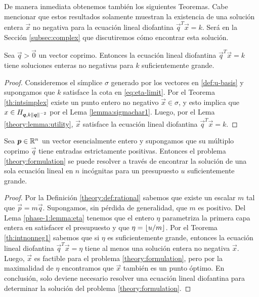 De manera inmediata obtenemos también los siguientes Teoremas. Cabe mencionar que estos resultados
solamente muestran la existencia de una solución entera $\vec{x}$ no negativa para la ecuación lineal
diofantina $\vec{q}^T\vec{x} = k$. Será en la Sección \ref{subsec:complex} que discutiremos cómo
encontrar esta solución.
\begin{theorem}
	\label{th:intnonneg1}
	Sea $\vec{q} > \vec{0}$ un vector coprimo. Entonces la ecuación lineal diofantina
	$\vec{q}^T\vec{x} = k$ tiene soluciones enteras no negativas para $k$ suficientemente grande.
\end{theorem}
\begin{proof}
	Consideremos el símplice $\sigma$ generado por los vectores en \eqref{def:u-basis} y supongamos
	que $k$ satisface la cota en \eqref{eq:eta-limit}.
	Por el Teorema \ref{th:intsimplex} existe un punto entero no negativo $\vec{x} \in \sigma$, y
	esto implica que $x \in H_{\boldsymbol{q}, k\left\lVert \boldsymbol{q} \right\rVert^{-2}}$ por el Lema \ref{lemma:sigmachar1}.
	Luego, por el Lema \ref{theory:lemma:utility}, $\vec{x}$ satisface la ecuación lineal diofantina
	$\vec{q}^T\vec{x} = k$.
\end{proof}
\begin{theorem}
	Sea $\boldsymbol{p} \in \mathbb{R}^n$ un vector esencialmente entero y supongamos que su múltiplo coprimo
	$\vec{q}$ tiene entradas estrictamente positivas. Entonces el problema
	\eqref{theory:formulation} se puede resolver a través de encontrar la solución de una sola
	ecuación lineal en $n$ incógnitas para un presupuesto $u$ suficientemente grande.
\end{theorem}
\begin{proof}
	Por la Definición \ref{theory:def:rational} sabemos que existe un escalar $m$ tal que
	$\vec{p} = m\vec{q}$. Supongamos, sin pérdida de generalidad, que $m$ es positivo. Del Lema
	\ref{phase-1:lemma:eta} tenemos que el entero $\eta$ parametriza la primera capa entera en
	satisfacer el presupuesto y que $\eta = \left\lfloor u/m \right\rfloor$. Por el Teorema \ref{th:intnonneg1} sabemos
	que si $\eta$ es suficientemente grande, entonces la ecuación lineal diofantina
	$\vec{q}^T\vec{x} = \eta$ tiene al menos una solución entera no negativa $\vec{x}$. Luego,
	$\vec{x}$ es factible para el problema \eqref{theory:formulation}, pero por la maximalidad de
	$\eta$ encontramos que $\vec{x}$ también es un punto óptimo. En conclusión, solo deviene
	necesario resolver una ecuación lineal diofantina para determinar la solución del problema
	\eqref{theory:formulation}.
\end{proof}

